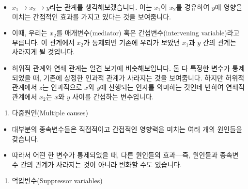 \documentclass[]{book}
\providecommand{\tightlist}{%
  \setlength{\itemsep}{0pt}\setlength{\parskip}{0pt}}
\begin{document}
\begin{itemize}
\tightlist
\item
  \(x_1 \rightarrow x_2 \rightarrow y\)라는 관계를 생각해보겠습니다. 이는 \(x_1\)이 \(x_2\)를 경유하여 \(y\)에 영향을 미치는 간접적인 효과를 가지고 있다는 것을 보여줍니다.
\item
  이때, 우리는 \(x_2\)를 매개변수(mediator) 혹은 간섭변수(intervening variable)라고 부릅니다. 이 관계에서 \(x_2\)가 통제되면 기존에 우리가 보았던 \(x_1\)과 \(y\) 간의 관계는 사라지게 될 것입니다.
\item
  허위적 관계와 연쇄 관계는 일견 보기에 비슷해보입니다. 둘 다 특정한 변수가 통제되었을 때, 기존에 상정한 인과적 관계가 사라지는 것을 보여줍니다. 하지만 허위적 관계에서 \(z\)는 인과적으로 \(x\)와 \(y\)에 선행되는 인자를 의미하는 것인데 반하여 연쇄적 관계에서 \(x_2\)는 \(x\)와 \(y\) 사이를 간섭하는 변수입니다.
\end{itemize}

\begin{enumerate}
\def\labelenumi{\arabic{enumi}.}
\setcounter{enumi}{2}
\tightlist
\item
  다중원인(Multiple causes)
\end{enumerate}

\begin{itemize}
\tightlist
\item
  대부분의 종속변수들은 직접적이고 간접적인 영향력을 미치는 여러 개의 원인들을 갖습니다.
\item
  따라서 어떤 한 변수가 통제되었을 때, 다른 원인들의 효과---즉, 원인들과 종속변수 간의 관계가 사라지는 것이 아니라 변화할 수도 있습니다.
\end{itemize}

\begin{enumerate}
\def\labelenumi{\arabic{enumi}.}
\setcounter{enumi}{3}
\tightlist
\item
  억압변수(Suppressor variables)
\end{enumerate}
\end{document}
